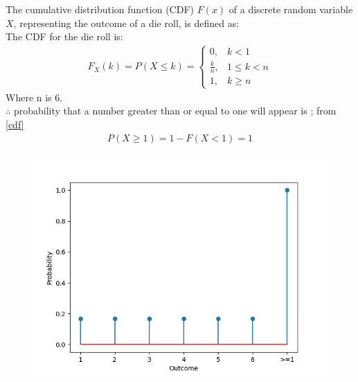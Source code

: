 \documentclass[journal]{IEEEtran}
\begin{document}
	The cumulative distribution function (CDF) \(F(x)\) of a discrete random variable \(X\), representing the outcome of a die roll, is defined as:\\
	The CDF for the die roll is:
	\begin{align}
		F_X(k) = P(X \leq k) =
		\begin{cases}
			0, & k < 1 \\
			\frac{k}{n}, & 1 \leq k < n\\
			1, & k \geq n
		\end{cases} \label{cdf}
	\end{align}
	Where n is 6. \\ 
	$\therefore$ probability that a number greater than or equal to one will
	appear is ; from \eqref{cdf}
	\begin{align}
		P(X \geq 1) = 1 - F(X < 1) = 1
	\end{align} 
	
	\begin{figure}[h!]
		\centering
		\includegraphics[width=\columnwidth]{figs/Fig.png}
		\label{stemplot}
	\end{figure}
	
\end{document}
